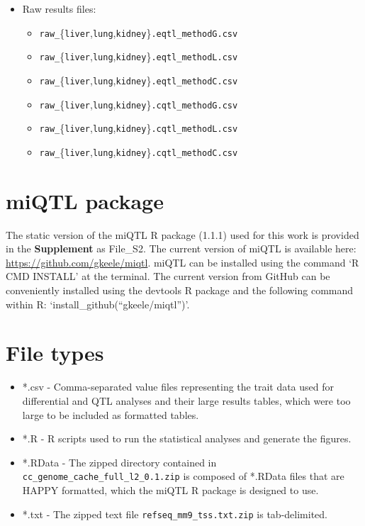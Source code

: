 \documentclass[10pt,letterpaper,twoside]{article}
\begin{document}
\begin{itemize}
\begin{itemize}
\begin{itemize}
		\end{itemize}
	\end{itemize}
		\item Raw results files:
	\begin{itemize}
		\item \texttt{raw\_}\{\texttt{liver},\texttt{lung},\texttt{kidney}\}\texttt{.eqtl\_methodG.csv}
		\item \texttt{raw\_}\{\texttt{liver},\texttt{lung},\texttt{kidney}\}\texttt{.eqtl\_methodL.csv}
		\item \texttt{raw\_}\{\texttt{liver},\texttt{lung},\texttt{kidney}\}\texttt{.eqtl\_methodC.csv}
		\item \texttt{raw\_}\{\texttt{liver},\texttt{lung},\texttt{kidney}\}\texttt{.cqtl\_methodG.csv}
		\item \texttt{raw\_}\{\texttt{liver},\texttt{lung},\texttt{kidney}\}\texttt{.cqtl\_methodL.csv}
		\item \texttt{raw\_}\{\texttt{liver},\texttt{lung},\texttt{kidney}\}\texttt{.cqtl\_methodC.csv}
	\end{itemize}
\end{itemize}

\section*{miQTL package}

The static version of the miQTL R package (1.1.1) used for this work is provided in the \textbf{Supplement} as File\_S2. The current version of miQTL is available here: \url{https://github.com/gkeele/miqtl}. miQTL can be installed using the command `R CMD INSTALL' at the terminal. The current version from GitHub can be conveniently installed using the devtools R package and the following command within R: `install\_github(``gkeele/miqtl'')'.

\section*{File types}

\begin{itemize}
	\item *.csv - Comma-separated value files representing the trait data used for differential and QTL analyses and their large results tables, which were too large to be included as formatted tables.
	\item *.R - R scripts used to run the statistical analyses and generate the figures.
	\item *.RData - The zipped directory contained in \texttt{cc\_genome\_cache\_full\_l2\_0.1.zip} is composed of *.RData files that are HAPPY formatted, which the miQTL R package is designed to use.
	\item *.txt - The zipped text file \texttt{refseq\_mm9\_tss.txt.zip} is tab-delimited.
\end{itemize}
\end{document}
